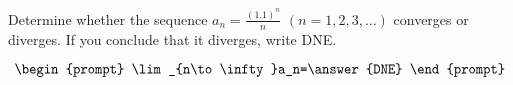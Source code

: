 \documentclass{ximera}
\author{Gregory Hartman \and Matthew Carr}
\begin{document}
\begin{exercise}



Determine whether the sequence $a_n=\frac{(1.1)^n}{n}$ $(n=1,2,3,\ldots)$ converges or diverges. If you conclude that it diverges, write DNE.

\[
\begin{prompt}
\lim_{n\to\infty}a_n=\answer{DNE}
\end{prompt}
\]


\end{exercise}
\end{document}
